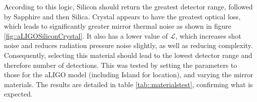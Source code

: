 \documentclass{article}
\begin{document}
According to this logic, Silicon should return the greatest detector
range, followed by Sapphire and then Silica. Crystal appears to have
the greatest optical loss, which leads to significantly greater mirror
thermal noise as shown in figure \ref{fig::aLIGOSiliconCrystal}. It
also has a lower value of $\mathcal{L}$, which increases shot noise
and reduces radiation pressure noise slightly, as well as reducing
complexity. Consequently, selecting this material should lead to the
lowest detector range and therefore number of detections. This was
tested by setting the parameters to those for the aLIGO model
(including Island for location), and varying the mirror materials. The
results are detailed in table \ref{tab::materialstest}, confirming
what is expected. 
\end{document}

